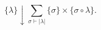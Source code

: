\begin{equation}
	{\{}\lambda{\}} \downarrow \sum_{\sigma \vdash |\lambda|} {\{} 
	\sigma {\}} \times {\{} \sigma \circ \lambda {\}}.
\label{eq:GlpqBranching}
\end{equation}

